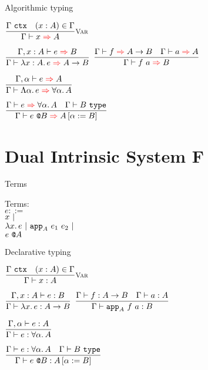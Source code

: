 \documentclass{beamer}
\begin{document}
\begin{frame}{Algorithmic typing}

\begin{center}
  $\infrule[Var]{\ctx{\Gamma} \quad \sidecond{(x : A) \in \Gamma}}{\infer{x}{A}}$

  \vspace{2em}

  $\infrule{\infer[\extend{\Gamma}{x}{A}]{e}{B}}{\infer{\fun{x}[A]{e}}{\Fun{A}{B}}}$ \quad
  $\infrule{\infer{f}{\Fun{A}{B}} \quad \infer{a}{A}}{\infer{\app{f}{a}}{B}}$

  \vspace{2em}

  $\infrule{\infer[\extendtype{\Gamma}{\alpha}]{e}{A}}{\infer{\tfun{\alpha}{e}}{\ForallT{\alpha}{A}}}$

  \vspace{2em}

  $\infrule{\infer{e}{\ForallT{\alpha}{A}} \quad \type{B}}{\infer{\tapp{e}{B}}{\subst{A}{\alpha}{B}}}$
\end{center}

\end{frame}

\section{Dual Intrinsic System F}

\begin{frame}{Terms}

Terms: \\
$e ::=$ \\
\qquad $x \ |\  $ \\
\qquad $\fun{x}{e} \pipe \app[A]{e_1}{e_2} \pipe$ \\
\qquad $e\ \texttt{@}A$

\end{frame}

\begin{frame}{Declarative typing}

\begin{center}
  $\infrule[Var]{\ctx{\Gamma} \quad \sidecond{(x : A) \in \Gamma}}{\typing{x}{A}}$

  \vspace{2em}

  $\infrule{\typing[\extend{\Gamma}{x}{A}]{e}{B}}{\typing{\fun{x}{e}}{\Fun{A}{B}}}$ \quad
  $\infrule{\typing{f}{\Fun{A}{B}} \quad \typing{a}{A}}{\typing{\app[A]{f}{a}}{B}}$

  \vspace{2em}

  $\infrule{\typing[\extendtype{\Gamma}{\alpha}]{e}{A}}{\typing{e}{\ForallT{\alpha}{A}}}$

  \vspace{2em}

  $\infrule{\typing{e}{\ForallT{\alpha}{A}} \quad \type{B}}{\typing{\tapp{e}{B}}{\subst{A}{\alpha}{B}}}$
\end{center}

\end{frame}
\end{document}
